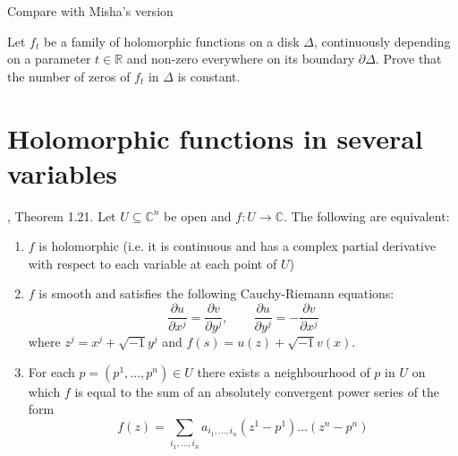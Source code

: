 Compare with Misha's version

\begin{theorem}
\label{theorem-Rouche-theorem-Mishas-version}
Let $f_t$ be a family of holomorphic functions on a disk  $\Delta$, continuously
depending on a parameter $t\in \mathbb{R}$ and non-zero everywhere on its
boundary $\partial\Delta$. Prove that the number of zeros of $f_t$ in $\Delta$
is constant.
\end{theorem}

\section{Holomorphic functions in several variables}
\label{section-holomorphic-functions-in-several-variables}

\begin{lemma}
\label{lemma-holomorphic-function-characterization}
\cite{lec}, Theorem 1.21. Let $U\subseteq\mathbb{C}^n$ be open and $f:U\to
\mathbb{C}$. The following are equivalent:
\begin{enumerate}
\item $f$ is holomorphic (i.e. it is continuous and has a complex partial
derivative with respect to each variable at each point of $U$)
\item $f$ is smooth and satisfies the following Cauchy-Riemann equations:
\begin{equation}
\label{equation-Cauchy-Riemann-several-variables}
\frac{\partial u}{\partial x^j}=\frac{\partial v}{\partial y^j},\qquad 
\frac{\partial u}{\partial y^j}=-\frac{\partial v}{\partial x^j}
\end{equation}
where $z^j=x^j+\sqrt{-1}y^j$ and $f(s)=u(z)+\sqrt{-1}v(x)$.
\item For each $p=(p^1,\ldots,p^n)\in U$ there exists a neighbourhood of $p$ in
$U$ on which $f$ is equal to the sum of an absolutely convergent power series of
the form
\begin{equation}
\label{equation-Taylor-series-several-variables}
f(z)=\sum_{i_1,\ldots,i_n}a_{i_1,\ldots,i_n}(z^1-p^1)\ldots(z^n-p^n)
\end{equation}
\end{enumerate}
\end{lemma}

